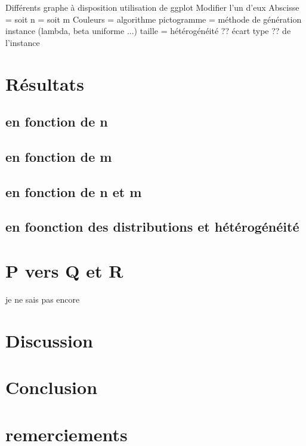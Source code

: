\documentclass[a4paper,12pt]{report}
\theoremstyle{plain}				%
\theoremstyle{definition}				%
\begin{document}
Différents graphe à disposition
utilisation de ggplot
Modifier l'un d'eux
Abscisse 	= soit n
			= soit m
Couleurs = algorithme
pictogramme = méthode de génération instance (lambda, beta uniforme ...) 
taille = hétérogénéité ?? écart type ?? de l'instance




\section{Résultats} \label{sec:resultats}

\subsection{en fonction de n}\label{subsec:en fonction de n}

\subsection{en fonction de m}\label{subsec:en fonction de m}

\subsection{en fonction de n et m}\label{subsec:en fonction de n et m}

\subsection{en foonction des distributions et hétérogénéité}
\label{subsec:en foonction des distributions et hétérogénéité}



\section{P vers Q et R} \label{sec:P vers Q et R}

je ne sais pas encore



\section{Discussion} \label{sec:discussion}


\section{Conclusion} \label{sec:conclusion}

\section{remerciements}


\end{document}
